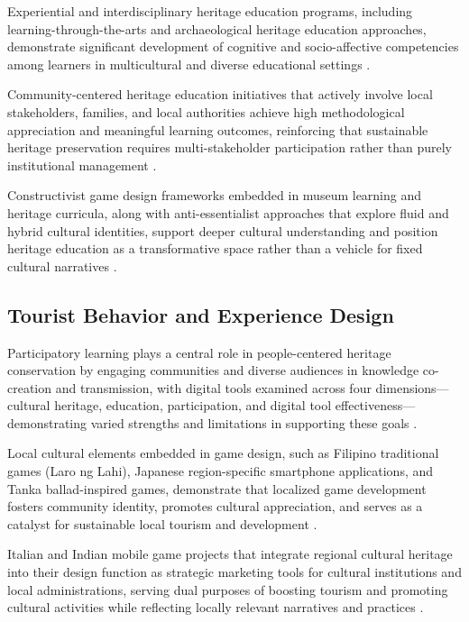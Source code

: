 \documentclass{research}
\begin{document}
Experiential and interdisciplinary heritage education programs, including
learning-through-the-arts and archaeological heritage education approaches, demonstrate
significant development of cognitive and socio-affective competencies among learners in
multicultural and diverse educational settings
\citep{gomezhurtado2021,gonzalezsanz2022,greaves2023,castrocalvino2020}.

Community-centered heritage education initiatives that actively involve local
stakeholders, families, and local authorities achieve high methodological appreciation
and meaningful learning outcomes, reinforcing that sustainable heritage preservation
requires multi-stakeholder participation rather than purely institutional management
\citep{castrocalvino2020,greaves2023,santos2024,abdallah2023}.

Constructivist game design frameworks embedded in museum learning and heritage
curricula, along with anti-essentialist approaches that explore fluid and hybrid cultural
identities, support deeper cultural understanding and position heritage education as a
transformative space rather than a vehicle for fixed cultural narratives
\citep{wang2025,park2023,lopezfernandez2021,perezguilarte2023}.

\subsection{Tourist Behavior and Experience Design}

Participatory learning plays a central role in people-centered heritage conservation
by engaging communities and diverse audiences in knowledge co-creation and transmission,
with digital tools examined across four dimensions---cultural heritage, education,
participation, and digital tool effectiveness---demonstrating varied strengths and
limitations in supporting these goals \citep{jangra2025,santos2024,greaves2023}.

Local cultural elements embedded in game design, such as Filipino traditional games
(Laro ng Lahi), Japanese region-specific smartphone applications, and Tanka
ballad-inspired games, demonstrate that localized game development fosters community
identity, promotes cultural appreciation, and serves as a catalyst for sustainable local
tourism and development \citep{roel2021,yasumasa2024,wu2022}.

Italian and Indian mobile game projects that integrate regional cultural heritage into
their design function as strategic marketing tools for cultural institutions and local
administrations, serving dual purposes of boosting tourism and promoting cultural
activities while reflecting locally relevant narratives and practices
\citep{samanta2022,zeiler2021,yasumasa2024}.
\end{document}
